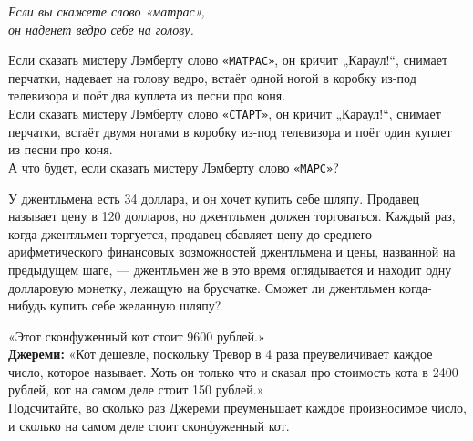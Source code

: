 ﻿

\begin{flushright} \itshape
Если вы скажете слово «матрас», \\
он наденет ведро себе на голову.
\end{flushright}

\begin{enumerate}
\itA Если сказать мистеру Лэмберту слово {\verb!«МАТРАС»!}, он кричит „Караул!“, снимает перчатки, надевает на голову ведро, встаёт одной ногой в коробку из-под телевизора и поёт два куплета из песни про коня.\smallskip \\
Если сказать мистеру Лэмберту слово {\verb!«СТАРТ»!}, он кричит „Караул!“, снимает перчатки, встаёт двумя ногами в коробку из-под телевизора и поёт один куплет из песни про коня.\smallskip \\
А что будет, если сказать мистеру Лэмберту слово {\verb!«МАРС»!}?

\itB У джентльмена есть 34 доллара, и он хочет купить себе шляпу. Продавец называет цену в 120 долларов, но джентльмен должен торговаться. Каждый раз, когда джентльмен торгуется, продавец сбавляет цену до среднего арифметического финансовых возможностей джентльмена и цены, названной на предыдущем шаге, — джентльмен же в это время оглядывается и находит одну долларовую монетку, лежащую на брусчатке. Сможет ли джентльмен когда-нибудь купить себе желанную шляпу?

 «Этот сконфуженный кот стоит 9600 рублей.» \\
{\bfseries Джереми:} «Кот дешевле, поскольку Тревор в 4 раза преувеличивает каждое число, которое называет. Хоть он только что и сказал про стоимость кота в 2400 рублей, кот на самом деле стоит 150 рублей.» \\
Подсчитайте, во сколько раз Джереми преуменьшает каждое произносимое число, и сколько на самом деле стоит сконфуженный кот.

\end{enumerate}